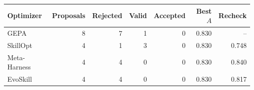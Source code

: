 \begin{tabular}{lrrrrrr}
\toprule
Optimizer & Proposals & Rejected & Valid & Accepted & Best $A$ & Recheck \\
\midrule
GEPA & 8 & 7 & 1 & 0 & 0.830 & -- \\
SkillOpt & 4 & 1 & 3 & 0 & 0.830 & 0.748 \\
Meta-Harness & 4 & 4 & 0 & 0 & 0.830 & 0.840 \\
EvoSkill & 4 & 4 & 0 & 0 & 0.830 & 0.817 \\
\bottomrule
\end{tabular}
